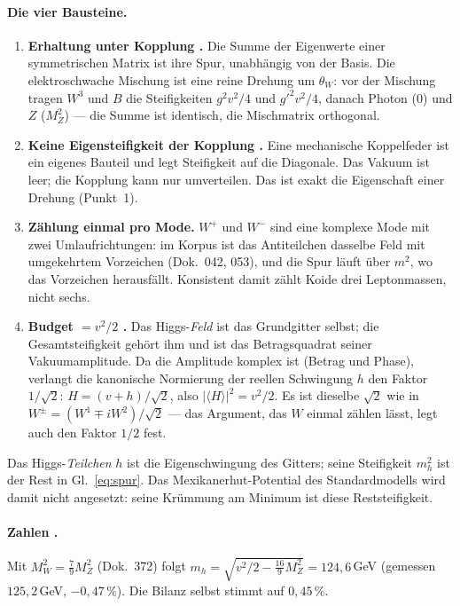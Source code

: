 \paragraph{Die vier Bausteine.}
\begin{enumerate}
\item \textbf{Erhaltung unter Kopplung \BM.} Die Summe der Eigenwerte einer
  symmetrischen Matrix ist ihre Spur, unabhängig von der Basis. Die
  elektroschwache Mischung ist eine reine Drehung um $\theta_W$: vor der
  Mischung tragen $W^3$ und $B$ die Steifigkeiten $g^2v^2/4$ und
  $g'^2v^2/4$, danach Photon ($0$) und $Z$ ($M_Z^2$) --- die Summe ist
  identisch, die Mischmatrix orthogonal.
\item \textbf{Keine Eigensteifigkeit der Kopplung \BM.} Eine mechanische
  Koppelfeder ist ein eigenes Bauteil und legt Steifigkeit auf die
  Diagonale. Das Vakuum ist leer; die Kopplung kann nur umverteilen. Das ist
  exakt die Eigenschaft einer Drehung (Punkt~1).
\item \textbf{Zählung einmal pro Mode.} $W^+$ und $W^-$ sind eine komplexe
  Mode mit zwei Umlaufrichtungen: im Korpus ist das Antiteilchen dasselbe
  Feld mit umgekehrtem Vorzeichen (Dok.~042, 053), und die Spur läuft über
  $m^2$, wo das Vorzeichen herausfällt. Konsistent damit zählt Koide drei
  Leptonmassen, nicht sechs.
\item \textbf{Budget $= v^2/2$ \BM.} Das Higgs-\emph{Feld} ist das
  Grundgitter selbst; die Gesamtsteifigkeit gehört ihm und ist das
  Betragsquadrat seiner Vakuumamplitude. Da die Amplitude komplex ist
  (Betrag und Phase), verlangt die kanonische Normierung der reellen
  Schwingung $h$ den Faktor $1/\sqrt2$: $H = (v+h)/\sqrt2$, also
  $|\langle H\rangle|^2 = v^2/2$. Es ist dieselbe $\sqrt2$ wie in
  $W^\pm = (W^1\mp iW^2)/\sqrt2$ --- das Argument, das $W$ einmal zählen
  lässt, legt auch den Faktor $1/2$ fest.
\end{enumerate}
Das Higgs-\emph{Teilchen} $h$ ist die Eigenschwingung des Gitters; seine
Steifigkeit $m_h^2$ ist der Rest in Gl.~\eqref{eq:spur}. Das
Mexikanerhut-Potential des Standardmodells wird damit nicht angesetzt:
seine Krümmung am Minimum ist diese Reststeifigkeit.

\paragraph{Zahlen \KM.}
Mit $M_W^2 = \tfrac79 M_Z^2$ (Dok.~372) folgt
$m_h = \sqrt{v^2/2 - \tfrac{16}{9}M_Z^2} = 124{,}6$\,GeV
(gemessen $125{,}2$\,GeV, $-0{,}47\,\%$). Die Bilanz selbst stimmt
auf $0{,}45\,\%$.

